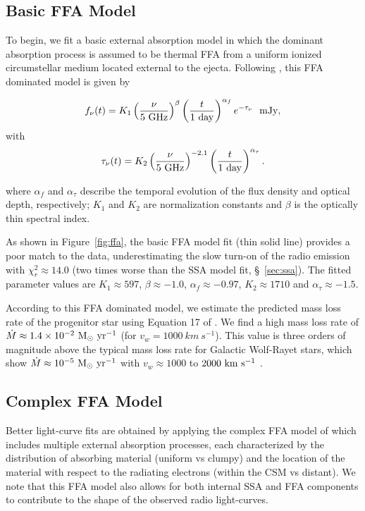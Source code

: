 \documentclass[12pt,preprint]{aastex}
\begin{document}
\subsection{Basic FFA Model}

To begin, we fit a basic external absorption model in which the
dominant absorption process is assumed to be thermal FFA from a
uniform ionized circumstellar medium located external to the
ejecta.  Following \citep{wsp+86}, this FFA dominated model is
given by

\begin{equation}
f_{\nu} (t) = K_1 \left(\frac{\nu}{5~\rm GHz}\right)^{\beta} \left(\frac{t}{1~\rm day}\right)^{\alpha_f} e^{-\tau_{\nu}}~~\rm mJy, 
\end{equation}
\noindent
with
\begin{equation}
\tau_{\nu} (t) =K_2 \left(\frac{\nu}{5~\rm GHz}\right)^{-2.1} \left(\frac{t}{1~\rm day}\right)^{\alpha_{\tau}}.
\end{equation}

\noindent
where $\alpha_f$ and $\alpha_{\tau}$ describe the temporal evolution
of the flux density and optical depth, respectively; $K_1$ and $K_2$
are normalization constants and $\beta$ is the optically thin spectral
index.  

As shown in Figure~\ref{fig:ffa}, the basic FFA model fit (thin solid
line) provides a poor match to the data, underestimating the slow
turn-on of the radio emission with $\chi^2_r \approx 14.0$ (two times
worse than the SSA model fit, \S~\ref{sec:ssa}). The fitted parameter 
values are $K_1\approx 597$, $\beta\approx -1.0$, $\alpha_f\approx
-0.97$, $K_2\approx 1710$ and $\alpha_{\tau}\approx -1.5$.

According to this FFA dominated model, we estimate the predicted mass
loss rate of the progenitor star using Equation 17 of
\citet{wpm01}. We find a high mass loss rate of $\dot{M}\approx
1.4\times 10^{-2}~\rm M_{\odot}~yr^{-1}$ (for $v_w=1000~km~s^{-1}$).
This value is three orders of magnitude above the typical mass loss
rate for Galactic Wolf-Rayet stars, which show $\dot{M}\approx
10^{-5}~\rm M_{\odot}~yr^{-1}$ with $v_w\approx 1000$ to $2000~\rm
km~s^{-1}$ \citep{cgv04}.

\subsection{Complex FFA Model}

Better light-curve fits are obtained by applying the complex FFA model of
\citet{wpm01} which includes multiple external absorption processes,
each characterized by the distribution of absorbing material (uniform
vs clumpy) and the location of the material with respect to the
radiating electrons (within the CSM vs distant).  We note that this
FFA model also allows for both internal SSA and FFA components
to contribute to the shape of the observed radio light-curves.  
\end{document}
